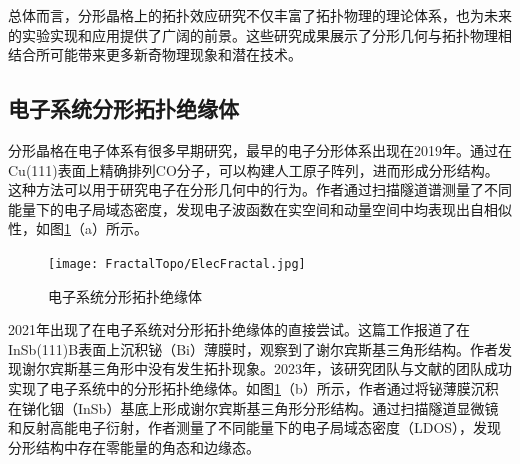 总体而言，分形晶格上的拓扑效应研究不仅丰富了拓扑物理的理论体系，也为未来的实验实现和应用提供了广阔的前景。这些研究成果展示了分形几何与拓扑物理相结合所可能带来更多新奇物理现象和潜在技术。

\subsection{电子系统分形拓扑绝缘体}
分形晶格在电子体系有很多早期研究，最早的电子分形体系出现在2019年\cite{kempkes2019design}。通过在Cu(111)表面上精确排列CO分子，可以构建人工原子阵列，进而形成分形结构。这种方法可以用于研究电子在分形几何中的行为。作者通过扫描隧道谱测量了不同能量下的电子局域态密度，发现电子波函数在实空间和动量空间中均表现出自相似性，如图\ref{fig:ElecFractal}（a）所示。
\begin{figure}[htbp]
    \centering
    \texttt{[image: FractalTopo/ElecFractal.jpg]}
    \caption{电子系统分形拓扑绝缘体}
    \label{fig:ElecFractal}
\end{figure}
2021年出现了在电子系统对分形拓扑绝缘体的直接尝试\cite{liu2021sierpinski}。这篇工作报道了在InSb(111)B表面上沉积铋（Bi）薄膜时，观察到了谢尔宾斯基三角形结构。作者发现谢尔宾斯基三角形中没有发生拓扑现象。2023年，该研究团队与文献\cite{kempkes2019design}的团队成功实现了电子系统中的分形拓扑绝缘体。如图\ref{fig:ElecFractal}（b）所示，作者通过将铋薄膜沉积在锑化铟（InSb）基底上形成谢尔宾斯基三角形分形结构。通过扫描隧道显微镜和反射高能电子衍射，作者测量了不同能量下的电子局域态密度（LDOS），发现分形结构中存在零能量的角态和边缘态。

